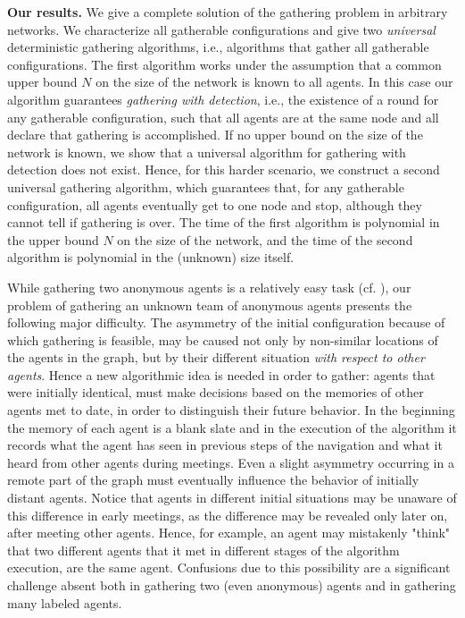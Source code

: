 \documentclass[11pt]{article}
\begin{document}
\noindent
{\bf Our results.}
We give a complete solution of the gathering problem in arbitrary networks. We characterize all gatherable configurations and give two {\em universal} deterministic 
gathering algorithms, i.e., algorithms that gather all gatherable configurations. The first algorithm works under the assumption that a common upper bound $N$
on the size of the network is known to all agents. In this case our algorithm guarantees {\em gathering with detection}, i.e., the existence of a round 
for any gatherable configuration, such that  all agents are at the
same node and all declare that gathering is accomplished. If no upper bound on the size of the network is known, we show that a universal algorithm for gathering
with detection does not exist. Hence, for this harder scenario, we construct a second universal gathering algorithm, which guarantees that, for any gatherable
configuration, all agents eventually get to one node and stop, although they cannot tell if gathering is over. The time of the first algorithm is polynomial in the
upper bound $N$ on the size of the network, and the time of the second algorithm is polynomial in the (unknown) size itself.

While gathering two anonymous agents is a relatively easy task (cf. \cite{CKP}),
our problem of gathering an unknown team of anonymous agents  
presents the following major difficulty. The asymmetry of the initial configuration
because of which gathering is feasible, may be caused not only by non-similar locations
of the agents in the graph, but by their different situation {\em with respect to other agents}.
Hence a new algorithmic idea is needed in order to gather: agents
that were initially identical, must make decisions based on the memories
of other agents met to date, in order to distinguish their future behavior. 
In the beginning the memory of each agent is a blank slate and
in the execution of the algorithm it records what the agent has seen in 
previous steps of the navigation and what it heard from other agents during meetings.
Even a slight asymmetry occurring  in a remote part of the graph
must eventually influence the behavior of initially distant agents.
Notice that agents in different initial situations may be unaware of this difference in early meetings, as the difference
may be revealed only later on, after meeting other agents. Hence, for example,  an agent may mistakenly "think" that two different agents
that it met in different stages of the algorithm execution, are the same agent. 
Confusions due to this possibility are a significant
challenge absent both in gathering two (even anonymous) agents and in gathering many labeled agents. 
\end{document}
